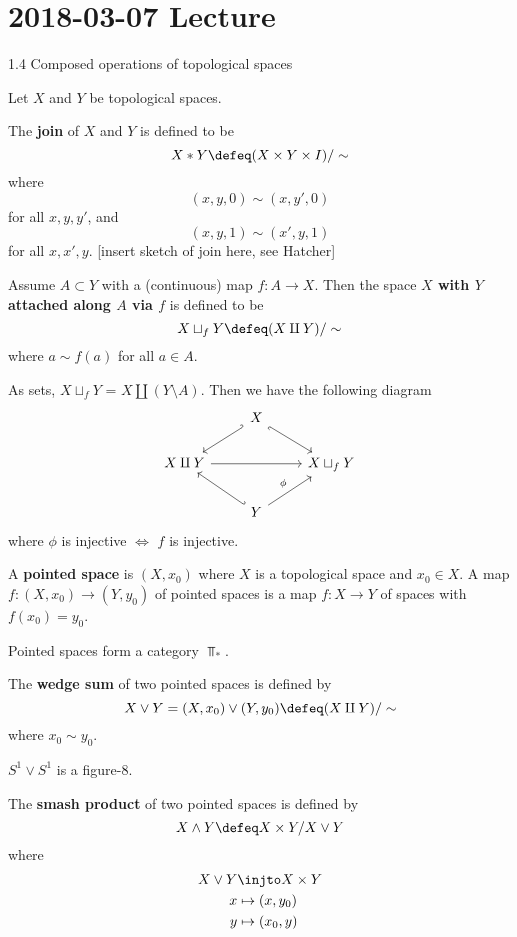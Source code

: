 \section{2018-03-07 Lecture}

1.4 Composed operations of topological spaces

Let $X$ and $Y$ be topological spaces.

\begin{defn}
	The \textbf{join} of $X$ and $Y$ is defined to be
	\[X*Y \defeq (X \times Y \times I)/\sim\]
	where
	\[(x,y,0) \sim (x,y',0)\]
	for all $x,y,y'$, and
	\[(x,y,1) \sim (x',y,1)\]
	for all $x,x',y$.
	[insert sketch of join here, see Hatcher]
\end{defn}

\begin{defn}
	Assume $A \subset Y$ with a (continuous) map $f:A \to X$.
	Then the space \textbf{$X$ with $Y$ attached along $A$ via $f$} is defined to be
	\[X \sqcup_f Y \defeq (X \amalg Y)/\sim\]
	where $a \sim f(a)$ for all $a \in A$.
	
	As sets, $X \sqcup_f Y$ = $X \amalg (Y \setminus A)$.
	Then we have the following diagram
	\[
	\begin{tikzcd}
		& X \arrow[rd, hook'] \arrow[ld, hook'] &  \\
		X \amalg Y \arrow[rr] &  & X \sqcup_f Y \\
		& Y \arrow[ru, "\phi"] \arrow[lu, hook'] & 
	\end{tikzcd}
	\]
	where $\phi$ is injective $\iff$ $f$ is injective.
\end{defn}

\begin{defn}
	A \textbf{pointed space} is $(X,x_0)$ where $X$ is a topological space and $x_0 \in X$.
	A map $f:(X,x_0) \to (Y,y_0)$ of pointed spaces is a map $f:X \to Y$ of spaces with $f(x_0)=y_0$.
	
	Pointed spaces form a category $\Top_*$.
\end{defn}

\begin{defn}
	The \textbf{wedge sum} of two pointed spaces is defined by
	\[X \vee Y = (X,x_0) \vee (Y,y_0) \defeq (X \amalg Y)/\sim\]
	where $x_0 \sim y_0$.
\end{defn}

\begin{exam}
	$S^1 \vee S^1$ is a figure-8.
\end{exam}

\begin{defn}
	The \textbf{smash product} of two pointed spaces is defined by
	\[X \wedge Y \defeq X \times Y / X \vee Y\]
	where
	\begin{align*}
		X \vee Y &\injto X \times Y \\
		x &\mapsto (x,y_0) \\
		y &\mapsto (x_0,y)
	\end{align*}
\end{defn}

